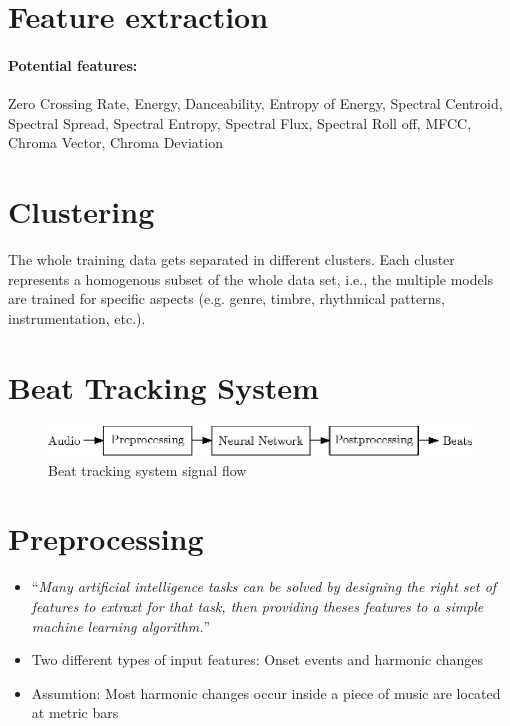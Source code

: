\documentclass{article}
\begin{document}
\section{Feature extraction}

\paragraph{Potential features:} Zero Crossing Rate, Energy, Danceability, Entropy of Energy, Spectral Centroid, Spectral Spread, Spectral Entropy, Spectral Flux, Spectral Roll off, MFCC, Chroma Vector, Chroma Deviation



\section{Clustering}
The whole training data gets separated in different clusters. Each cluster represents a homogenous subset of the whole data set, i.e., the multiple models are trained for specific aspects (e.g. genre, timbre, rhythmical patterns, instrumentation, etc.). 


\section{Beat Tracking System}

\begin{figure}[htbp]
\centering
\includegraphics[scale=1.0]{figures/beat_tracking_system.eps}
\caption{Beat tracking system signal flow}
\label{fig:}
\end{figure}	

\section{Preprocessing}

\begin{itemize}
\item ``\emph{Many artificial intelligence tasks can be solved by designing the right set of features to extraxt for that task, then providing theses features to a simple machine learning algorithm.}'' \cite[Goodfellow2016]{Goodfellow2016}
\item Two different types of input features: Onset events and harmonic changes
\item Assumtion: Most harmonic changes occur inside a piece of music are located at metric bars \cite[Khadkevich2012]{Khadkevich2012}
\end{itemize}
\end{document}
